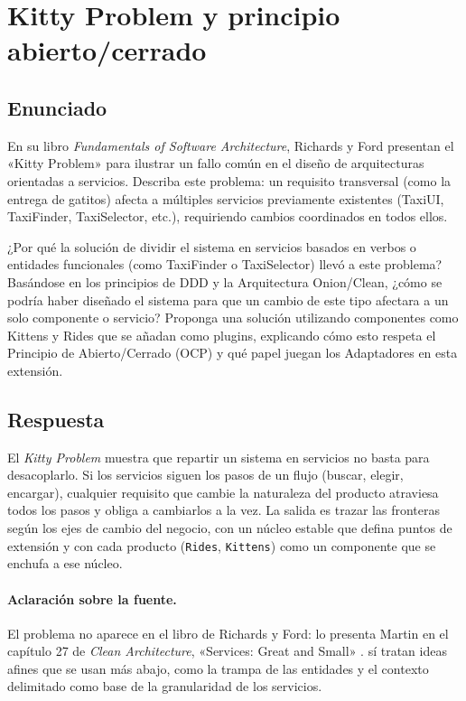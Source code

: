 \section{Kitty Problem y principio abierto/cerrado}

\subsection{Enunciado}
En su libro \emph{Fundamentals of Software Architecture}, Richards y Ford presentan el «Kitty
Problem» para ilustrar un fallo común en el diseño de arquitecturas orientadas a servicios.
Describa este problema: un requisito transversal (como la entrega de gatitos) afecta a múltiples
servicios previamente existentes (TaxiUI, TaxiFinder, TaxiSelector, etc.), requiriendo cambios
coordinados en todos ellos.

¿Por qué la solución de dividir el sistema en servicios basados en verbos o entidades
funcionales (como TaxiFinder o TaxiSelector) llevó a este problema? Basándose en los principios
de DDD y la Arquitectura Onion/Clean, ¿cómo se podría haber diseñado el sistema para que un
cambio de este tipo afectara a un solo componente o servicio? Proponga una solución utilizando
componentes como Kittens y Rides que se añadan como plugins, explicando cómo esto respeta el
Principio de Abierto/Cerrado (OCP) y qué papel juegan los Adaptadores en esta extensión.

\subsection{Respuesta}

El \emph{Kitty Problem} muestra que repartir un sistema en servicios no basta para desacoplarlo. Si
los servicios siguen los pasos de un flujo (buscar, elegir, encargar), cualquier requisito que
cambie la naturaleza del producto atraviesa todos los pasos y obliga a cambiarlos a la vez. La
salida es trazar las fronteras según los ejes de cambio del negocio, con un núcleo estable que
defina puntos de extensión y con cada producto (\texttt{Rides}, \texttt{Kittens}) como un componente
que se enchufa a ese núcleo.

\paragraph{Aclaración sobre la fuente.} El problema no aparece en el libro de Richards y Ford: lo
presenta Martin en el capítulo 27 de \emph{Clean Architecture}, «Services: Great and Small»
\parencite[pp.~242--244]{martin2017clean}. \textcite[caps.~8 y~17]{richards2020fundamentals} sí tratan ideas afines
que se usan más abajo, como la trampa de las entidades y el contexto delimitado como base de la
granularidad de los servicios.

